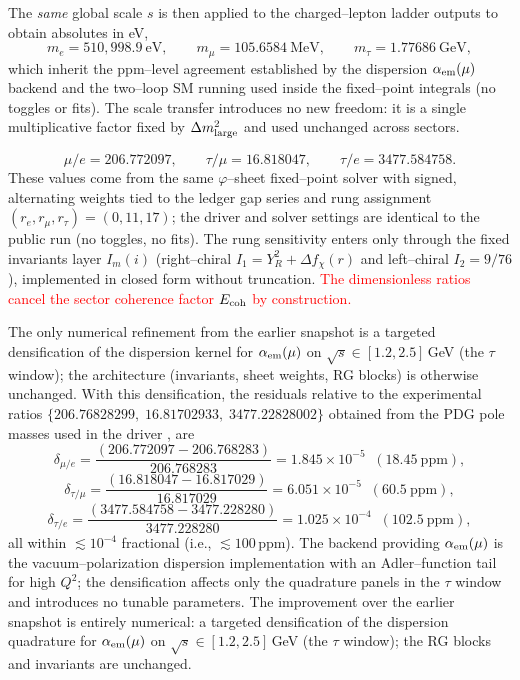 \documentclass[%
 amsmath,amssymb,
 aps,
prb,
floatfix, showkeys
]{revtex4-2}
\newcommand{\need}[1]{\textcolor{red}{#1}}
\begin{document}
The \emph{same} global scale $s$ is then applied to the charged--lepton ladder outputs to obtain absolutes in eV,
\[
m_e=510{,}998.9~\text{eV},\qquad
m_\mu=105.6584~\text{MeV},\qquad
m_\tau=1.77686~\text{GeV},
\]
which inherit the ppm--level agreement established by the dispersion $\alpha_{\rm em}(\mu)$ backend and the two--loop SM running used inside the fixed--point integrals (no toggles or fits). The scale transfer introduces no new freedom: it is a single multiplicative factor fixed by $\Delta m^2_{\rm large}$ and used unchanged across sectors.



\[
\mu/e=206.772097,\qquad \tau/\mu=16.818047,\qquad \tau/e=3477.584758.
\]
These values come from the same $\varphi$--sheet fixed--point solver with signed, alternating weights tied to the ledger gap series and rung assignment $(r_e,r_\mu,r_\tau)=(0,11,17)$; the driver and solver settings are identical to the public run (no toggles, no fits). The rung sensitivity enters only through the fixed invariants layer $I_m(i)$ (right--chiral $I_1=Y_R^2+\Delta f_\chi(r)$ and left--chiral $I_2=9/76$), implemented in closed form without truncation.
{\need{
    The dimensionless ratios cancel the sector coherence factor $E_{\rm coh}$ by construction.
}}

The only numerical refinement from the earlier snapshot is a targeted densification of the dispersion kernel for $\alpha_{\rm em}(\mu)$ on $\sqrt{s}\!\in[1.2,2.5]\,$GeV (the $\tau$ window); the architecture (invariants, sheet weights, RG blocks) is otherwise unchanged. With this densification, the residuals relative to the experimental ratios  $\{206.76828299,\; 16.81702933,\; 3477.22828002\}$ obtained from the PDG pole masses used in the driver \cite{PDG2024},  are
\[
\delta_{\mu/e}=\frac{(206.772097-206.768283)}{206.768283}=1.845\times 10^{-5}\;\;(18.45~\mathrm{ppm}),
\]
\[
\delta_{\tau/\mu}=\frac{(16.818047-16.817029)}{16.817029}=6.051\times 10^{-5}\;\;(60.5~\mathrm{ppm}),
\]
\[
\delta_{\tau/e}=\frac{(3477.584758-3477.228280)}{3477.228280}=1.025\times 10^{-4}\;\;(102.5~\mathrm{ppm}),
\]
 all within $\lesssim 10^{-4}$ fractional (i.e., $\lesssim 100$\,ppm). The backend providing $\alpha_{\rm em}(\mu)$ is the vacuum–polarization dispersion implementation with an Adler–function tail for high $Q^2$; the densification affects only the quadrature panels in the $\tau$ window and introduces no tunable parameters.
 The improvement over the earlier snapshot is entirely numerical: a targeted densification of the dispersion quadrature for $\alpha_{\rm em}(\mu)$ on $\sqrt{s}\!\in[1.2,2.5]\,$GeV (the $\tau$ window); the RG blocks and invariants are unchanged.
\end{document}
